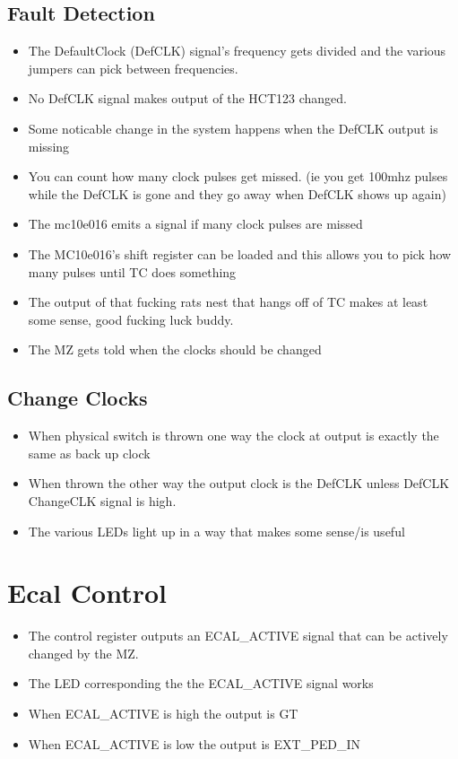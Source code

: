 \documentclass[11pt,a4paper]{article}
\begin{document}
\subsection{Fault Detection}
\begin{itemize}
\item The DefaultClock (DefCLK) signal's frequency gets divided and the various jumpers can pick between frequencies.
\item No DefCLK signal makes output of the HCT123 changed.
\item Some noticable change in the system happens when the DefCLK output is missing
\item You can count how many clock pulses get missed. (ie you get 100mhz pulses while the DefCLK is gone and they go away when DefCLK shows up again)
\item The mc10e016 emits a signal if many clock pulses are missed
\item The MC10e016's shift register can be loaded and this allows you to pick
how many pulses until TC does something 
\item The output of that fucking rats nest that hangs off of TC makes at least some sense, good fucking luck buddy.
\item The MZ gets told when the clocks should be changed
\end{itemize}
\subsection{Change Clocks}
\begin{itemize}
\item When physical switch is thrown one way the clock at output is exactly the same
as back up clock
\item When thrown the other way the output clock is the DefCLK unless DefCLK 
ChangeCLK signal is high.
\item The various LEDs light up in a way that makes some sense/is useful
\end{itemize}
\section{Ecal Control}
\begin{itemize}
\item The control register outputs an ECAL\_ACTIVE signal that can be actively
changed by the MZ.
\item The LED corresponding the the ECAL\_ACTIVE signal works
\item When ECAL\_ACTIVE is high the output is GT
\item When ECAL\_ACTIVE is low the output is EXT\_PED\_IN
\end{itemize}
\end{document}
